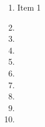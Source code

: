 \documentclass[a4paper]{article}
\begin{document}
\thispagestyle{empty}
\begin{center}
  \setlength{\fboxsep}{5mm}
\end{center}
\vspace{1cm}

\begin{enumerate}
    \setlength{\itemsep}{1cm}
    \setlength{\labelsep}{0.5cm}
  \item Item 1
  \item
  \item
  \item 
  \item 
  \item 
  \item 
  \item 
  \item 
  \item 
\end{enumerate}
\end{document}
